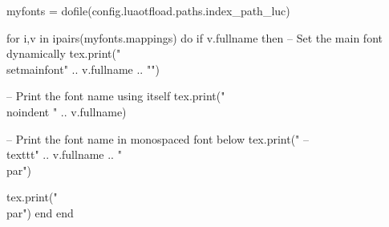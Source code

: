 \documentclass{article}
\begin{document}

\begin{luacode}
myfonts = dofile(config.luaotfload.paths.index_path_luc)

for i,v in ipairs(myfonts.mappings) do
    if v.fullname then
        -- Set the main font dynamically
        tex.print("\\setmainfont{" .. v.fullname .. "}")

        -- Print the font name using itself
        tex.print("\\noindent " .. v.fullname)

        -- Print the font name in monospaced font below
        tex.print(" -- \\texttt{" .. v.fullname .. "} \\par")

        tex.print("\\par")
      end
end
\end{luacode}
\end{document}
